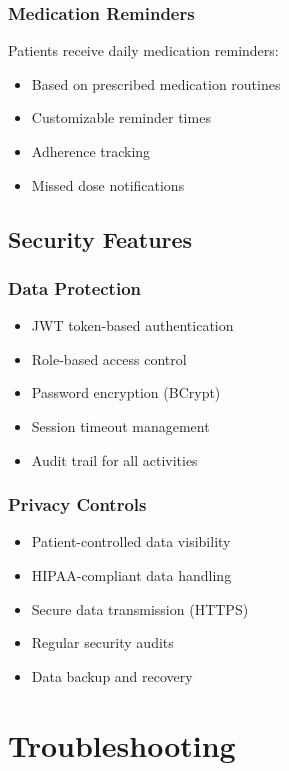 \documentclass[12pt,a4paper]{article}
\begin{document}
\subsubsection{Medication Reminders}

Patients receive daily medication reminders:
\begin{itemize}
    \item Based on prescribed medication routines
    \item Customizable reminder times
    \item Adherence tracking
    \item Missed dose notifications
\end{itemize}

\subsection{Security Features}

\subsubsection{Data Protection}

\begin{itemize}
    \item JWT token-based authentication
    \item Role-based access control
    \item Password encryption (BCrypt)
    \item Session timeout management
    \item Audit trail for all activities
\end{itemize}

\subsubsection{Privacy Controls}

\begin{itemize}
    \item Patient-controlled data visibility
    \item HIPAA-compliant data handling
    \item Secure data transmission (HTTPS)
    \item Regular security audits
    \item Data backup and recovery
\end{itemize}

\section{Troubleshooting}
\end{document}

